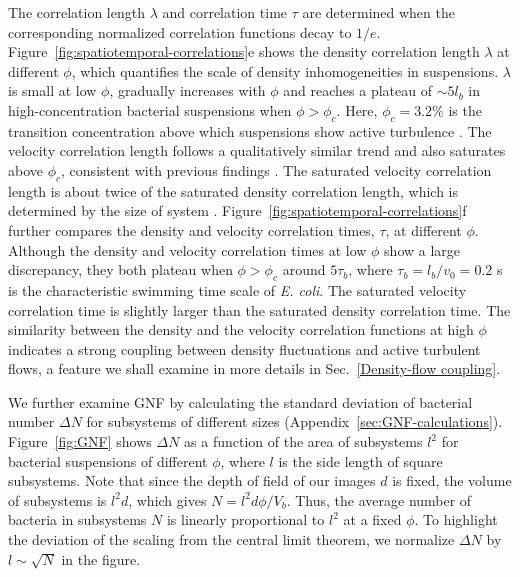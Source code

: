 \documentclass[twocolumn,aps,prx,amsmath,amssymb,longbibliography,superscriptaddress]{revtex4-2}
\begin{document}
The correlation length $\lambda$ and correlation time $\tau$ are determined when the corresponding normalized correlation functions decay to $1/e$. Figure~\ref{fig:spatiotemporal-correlations}e shows the density correlation length $\lambda$ at different $\phi$, which quantifies the scale of density inhomogeneities in suspensions.
$\lambda$ is small at low $\phi$, gradually increases with $\phi$ and reaches a plateau of $\sim 5l_b$ in high-concentration bacterial suspensions when $\phi > \phi_c$. Here, $\phi_c = 3.2\%$ is the transition concentration above which suspensions show active turbulence \cite{Peng2020}.
The velocity correlation length follows a qualitatively similar trend and also saturates above $\phi_c$, consistent with previous findings \cite{Sokolov2007}. The saturated velocity correlation length is about twice of the saturated density correlation length, which is determined by the size of system \cite{Guo2018}.  Figure~\ref{fig:spatiotemporal-correlations}f further compares the density and velocity correlation times, $\tau$, at different $\phi$. Although the density and velocity correlation times at low $\phi$ show a large discrepancy, they both plateau when $\phi > \phi_c$ around $5\tau_b$, where $\tau_b=l_b/v_0=0.2$ s is the characteristic swimming time scale of \textit{E. coli}. The saturated velocity correlation time is slightly larger than the saturated density correlation time. The similarity between the density and the velocity correlation functions at high $\phi$ indicates a strong coupling between density fluctuations and active turbulent flows, a feature we shall
examine in more details in Sec.~\ref{Density-flow coupling}.


We further examine GNF by calculating the standard deviation of bacterial number $\Delta N$ for subsystems of different sizes (Appendix~\ref{sec:GNF-calculations}). Figure~\ref{fig:GNF} shows $\Delta N$ as a function of the area of subsystems $l^2$ for bacterial suspensions of different $\phi$, where $l$ is the side length of square subsystems. Note that since the depth of field of our images $d$ is fixed, the volume of subsystems is $l^2 d$, which gives $N = l^2d \phi/V_b$. Thus, the average number of bacteria in subsystems $N$ is linearly proportional to $l^2$ at a fixed $\phi$. To highlight the deviation of the scaling from the central limit theorem, we normalize $\Delta N$ by $l \sim \sqrt N$ in the figure.
\end{document}
